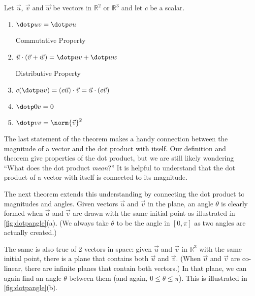 {Let $\vec u$, $\vec v$ and $\vec w$ be vectors in $\mathbb{R}^2$ or $\mathbb{R}^3$ and let $c$ be a scalar.
\begin{enumerate}
	\item \parbox{150pt}{$\dotp uv = \dotp vu$}{Commutative Property}
	\item \parbox{150pt}{$\vec u\cdot(\vec v+\vec w) = \dotp uv + \dotp uw$}{Distributive Property}
	\item	$c(\dotp uv) = (c\vec u)\cdot \vec v = \vec u \cdot (c\vec v)$
	\item	$\dotp 0v = 0$
	\item	$\dotp vv=\norm{\vec v}^2 $
\end{enumerate}}

The last statement of the theorem makes a handy connection between the magnitude of a vector and the dot product with itself. Our definition and theorem give properties of the dot product, but we are still likely wondering ``What does the dot product \emph{mean}?'' It is helpful to understand that the dot product of a vector with itself is connected to its magnitude.

The next theorem extends this understanding by connecting the dot product to magnitudes and angles. Given vectors $\vec u$ and $\vec v$ in the plane, an angle $\theta$ is clearly formed when $\vec u$ and $\vec v$ are drawn with the same initial point as illustrated in \autoref{fig:dotpangle}(a). (We always take $\theta$ to be the angle in $[0,\pi]$ as two angles are actually created.) 


The same is also true of 2 vectors in space: given $\vec u$ and $\vec v$ in $\mathbb{R}^3$ with the same initial point, there is a plane that contains both $\vec u$ and $\vec v$. (When $\vec u$ and $\vec v$ are co-linear, there are infinite planes that contain both vectors.) In that plane, we can again find an angle $\theta$ between them (and again, $0\leq \theta\leq \pi$). This is illustrated in \autoref{fig:dotpangle}(b).

